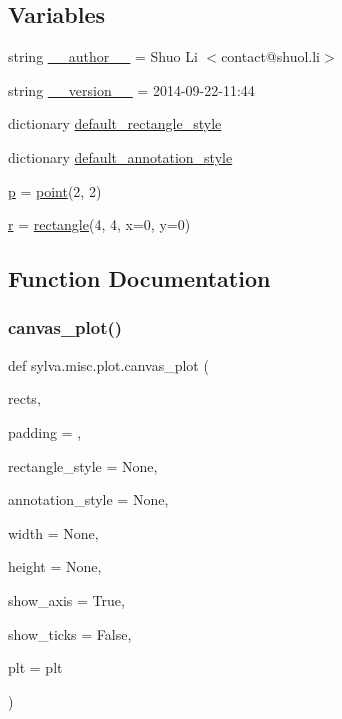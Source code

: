 \subsection*{Variables}
\begin{DoxyCompactItemize}
\item 
string \hyperlink{namespacesylva_1_1misc_1_1plot_a7500c696078a3d942b466b4627141020}{\+\_\+\+\_\+author\+\_\+\+\_\+} = \textquotesingle{}Shuo Li $<$contact@shuol.\+li$>$\textquotesingle{}
\item 
string \hyperlink{namespacesylva_1_1misc_1_1plot_aeaebaa88de4546f2ce3ff8b7e568797e}{\+\_\+\+\_\+version\+\_\+\+\_\+} = \textquotesingle{}2014-\/09-\/22-\/11\+:44\textquotesingle{}
\item 
dictionary \hyperlink{namespacesylva_1_1misc_1_1plot_a9d341463b25190ccc0193e07c697648f}{default\+\_\+rectangle\+\_\+style}
\item 
dictionary \hyperlink{namespacesylva_1_1misc_1_1plot_affc8bfc885cfaf5e1995cf4fd8d084c6}{default\+\_\+annotation\+\_\+style}
\item 
\hyperlink{namespacesylva_1_1misc_1_1plot_a0cda7def12ec7fe347a18675bc3f3ead}{p} = \hyperlink{classsylva_1_1misc_1_1plot_1_1point}{point}(2, 2)
\item 
\hyperlink{namespacesylva_1_1misc_1_1plot_a620aa90142604ebb167426bcbd31acb1}{r} = \hyperlink{classsylva_1_1misc_1_1plot_1_1rectangle}{rectangle}(4, 4, x=0, y=0)
\end{DoxyCompactItemize}


\subsection{Function Documentation}
\mbox{\label{namespacesylva_1_1misc_1_1plot_a405ea3f626f2fbeea085e412f742ce68}} 
\subsubsection{\texorpdfstring{canvas\+\_\+plot()}{canvas\_plot()}}
{\footnotesize\ttfamily def sylva.\+misc.\+plot.\+canvas\+\_\+plot (\begin{DoxyParamCaption}\item[{}]{rects,  }\item[{}]{padding = {},  }\item[{}]{rectangle\+\_\+style = {\ttfamily None},  }\item[{}]{annotation\+\_\+style = {\ttfamily None},  }\item[{}]{width = {\ttfamily None},  }\item[{}]{height = {\ttfamily None},  }\item[{}]{show\+\_\+axis = {\ttfamily True},  }\item[{}]{show\+\_\+ticks = {\ttfamily False},  }\item[{}]{plt = {\ttfamily plt} }\end{DoxyParamCaption})}



